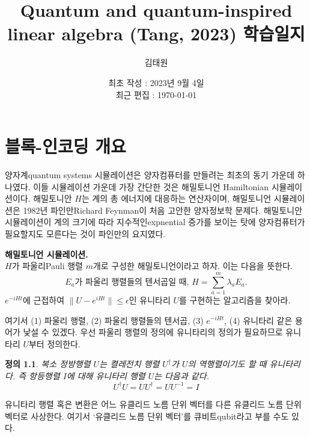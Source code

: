 \documentclass[a4paper,atbegshi,chapter]{oblivoir}
\title{\Large Quantum and quantum-inspired linear algebra (Tang, 2023) 학습일지}
\author{김태원}
\date{최초 작성 : 2023년 9월 4일 \\ 최근 편집 : \today}
\newtheorem{defn}{정의}[chapter]
\begin{document}
\maketitle
\chapter{블록-인코딩 개요}
양자계{\tiny quantum systems} 시뮬레이션은 양자컴퓨터를 만들려는 최초의 동기
가운데 하나였다. 이들 시뮬레이션 가운데 가장 간단한 것은 해밀토니언{\tiny 
Hamiltonian} 시뮬레이션이다.  해밀토니안 $H$는 계의 총 에너지에 대응하는 
연산자이며, 해밀토니언 시뮬레이션은 1982년 파인만{\tiny Richard
Feynman}이 처음 고안한 양자정보학 문제다. 해밀토니안 시뮬레이션이 계의 크기에
따라 지수적인{\tiny expnential} 증가를 보이는 탓에 양자컴퓨터가 필요할지도
모른다는 것이 파인만의 요지였다.

\begin{mdframed}
\textbf{해밀토니언 시뮬레이션.}\\ $H$가 파울리{\tiny Pauli} 행렬 $m$개로 구성한
    해밀토니언이라고 하자. 이는 다음을 뜻한다.
    \[
      E_a\textrm{가 파울리 행렬들의 텐서곱일 때, }H = \sum_{a=1}^m\lambda_a E_a.
    \]
    $e^{-iHt}$에 근접하여 $\|U-e^{iHt}\|\leq\epsilon$인 유니타리 $U$를
    구현하는 알고리즘을 찾아라.
\end{mdframed}

여기서 (1) 파울리 행렬, (2) 파울리 행렬들의 텐서곱, (3) $e^{-iHt}$, (4) 유니타리
같은 용어가 낯설 수 있겠다. 우선 파울리 행렬의 정의에 유니타리의 정의가 
필요하므로 유니타리 $U$부터 정의한다.
\begin{defn}
  복소 정방행렬 $U$는 켤레전치 행렬 $U^{\dagger}$가 $U$의 역행렬이기도 할 때 
  유니타리다. 즉 항등행렬 $I$에 대해 유니타리 행렬 $U$는 다음과 같다.
  \[
    U^{\dagger}U = UU^{\dagger} = UU^{-1} = I
  \]
\end{defn}
유니타리 행렬 혹은 변환은 어느 유클리드 노름 단위 벡터를 다른 유클리드 노름
단위 벡터로 사상한다. 여기서 `유클리드 노름 단위 벡터'를 큐비트{\tiny qubit}라고
부를 수도 있다. 
\end{document}
